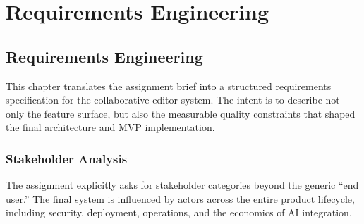\part{Requirements Engineering}

\chapter{Requirements Engineering}

This chapter translates the assignment brief into a structured requirements specification for the
collaborative editor system. The intent is to describe not only the feature surface, but also the
measurable quality constraints that shaped the final architecture and MVP implementation.

\section{Stakeholder Analysis}

The assignment explicitly asks for stakeholder categories beyond the generic “end user.” The final
system is influenced by actors across the entire product lifecycle, including security, deployment,
operations, and the economics of AI integration.

